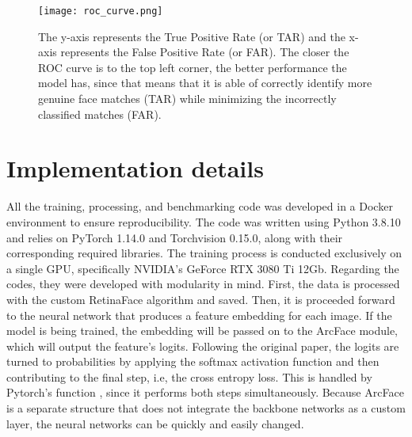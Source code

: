 \documentclass[class=report, crop=false, a4paper, 12pt]{standalone}
\begin{document}
\begin{figure}[!h]
  \centering
  \texttt{[image: roc\_curve.png]}
  \caption{The y-axis represents the True Positive Rate (or TAR) and the x-axis represents the False Positive Rate (or FAR). The closer the ROC curve is to the top left corner, the better performance the model has, since that means that it is able of correctly identify more genuine face matches (TAR) while minimizing the incorrectly classified matches (FAR).}
  \label{fig:roc_curve}
\end{figure}



\section{Implementation details}
\par All the training, processing, and benchmarking code was developed in a Docker environment to ensure reproducibility. The code was written using Python 3.8.10 and relies on PyTorch 1.14.0 and Torchvision 0.15.0, along with their corresponding required libraries. The training process is conducted exclusively on a single GPU, specifically NVIDIA's GeForce RTX 3080 Ti 12Gb. Regarding the codes, they were developed with modularity in mind. First, the data is processed with the custom RetinaFace algorithm and saved. Then, it is proceeded forward to the neural network that produces a feature embedding for each image. If the model is being trained, the embedding will be passed on to the ArcFace module, which will output the feature's logits. Following the original paper, the logits are turned to probabilities by applying the softmax activation function and then contributing to the final step, i.e, the cross entropy loss. This is handled by Pytorch's function , since it performs both steps simultaneously. Because ArcFace is a separate structure that does not integrate the backbone networks as a custom layer, the neural networks can be quickly and easily changed.
\end{document}
